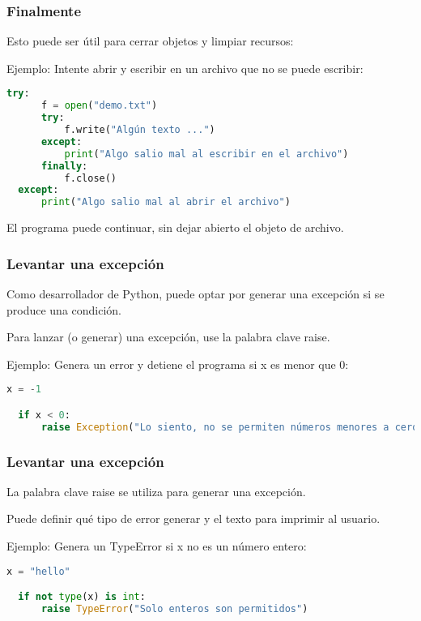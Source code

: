 \begin{frame}[fragile]
  \frametitle{Finalmente}

  Esto puede ser útil para cerrar objetos y limpiar recursos:

  \vspace{\baselineskip}
  Ejemplo: Intente abrir y escribir en un archivo que no se puede escribir:
  \begin{lstlisting}[language=Python]
  try:
      f = open("demo.txt")
      try:
          f.write("Algún texto ...")
      except:
          print("Algo salio mal al escribir en el archivo")
      finally:
          f.close()
  except:
      print("Algo salio mal al abrir el archivo")
  \end{lstlisting}

  \vspace{\baselineskip}
  El programa puede continuar, sin dejar abierto el objeto de archivo.
\end{frame}

\begin{frame}[fragile]
  \frametitle{Levantar una excepción}

  Como desarrollador de Python, puede optar por generar una excepción si
  se produce una condición.

  \vspace{\baselineskip}
  Para lanzar (o generar) una excepción, use la palabra clave
  \textcolor{codeKeyword2}{raise}.

  \vspace{\baselineskip}
  Ejemplo: Genera un error y detiene el programa si x es menor que 0:
  \begin{lstlisting}[language=Python]
  x = -1

  if x < 0:
      raise Exception("Lo siento, no se permiten números menores a cero")
  \end{lstlisting}
\end{frame}

\begin{frame}[fragile]
  \frametitle{Levantar una excepción}

  La palabra clave \textcolor{codeKeyword2}{raise} se utiliza para
  generar una excepción.

  \vspace{\baselineskip}
  Puede definir qué tipo de error generar y el texto para imprimir al usuario.

  \vspace{\baselineskip}
  Ejemplo: Genera un TypeError si x no es un número entero:
  \begin{lstlisting}[language=Python]
  x = "hello"

  if not type(x) is int:
      raise TypeError("Solo enteros son permitidos")
  \end{lstlisting}
\end{frame}

